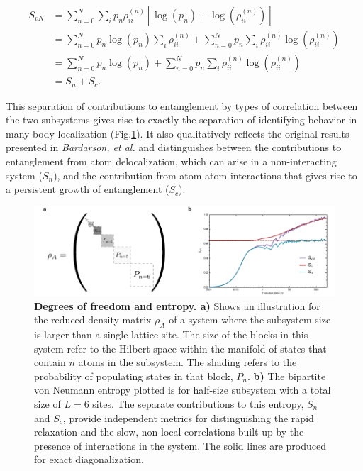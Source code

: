\begin{equation}
\begin{aligned}
S_{vN}&=\sum_{n=0}^N \sum_i p_n \rho_{ii}^{(n)} \left[\log{\left ( p_n \right )} + \log {\left ( \rho_{ii}^{(n)} \right )} \right] \\
&=\sum_{n=0}^N p_n \log{\left ( p_n \right )} \sum_i \rho_{ii}^{(n)} + \sum_{n=0}^N p_n \sum_{i} \rho_{ii}^{(n)} \log {\left ( \rho_{ii}^{(n)} \right )} \\
&=\sum_{n=0}^N p_n \log{\left ( p_n \right )} + \sum_{n=0}^N p_n \sum_{i} \rho_{ii}^{(n)} \log {\left ( \rho_{ii}^{(n)} \right )} \\
&=S_{n} + S_{c}.
\end{aligned}
\label{eqn:svn_sep}
\end{equation}

This separation of contributions to entanglement by types of correlation between the two subsystems gives rise to exactly the separation of identifying behavior in many-body localization (Fig.\ref{fig:sepSvn}). It also qualitatively reflects the original results presented in \emph{Bardarson, et al.}\cite{Bardarson2012} and distinguishes between the contributions to entanglement from atom delocalization, which can arise in a non-interacting system ($S_n$), and the contribution from atom-atom interactions that gives rise to a persistent growth of entanglement ($S_c$).

\begin{figure}[t!]
		\includegraphics[width=\columnwidth]{figures/ch5/combo_sep_svn.pdf} 
		\caption{\textbf{Degrees of freedom and entropy. a)} Shows an illustration for the reduced density matrix $\rho_A$ of a system where the subsystem size is larger than a single lattice site. The size of the blocks in this system refer to the Hilbert space within the manifold of states that contain $n$ atoms in the subsystem. The shading refers to the probability of populating states in that block, $P_n$. \textbf{b)} The bipartite von Neumann entropy plotted is for half-size subsystem with a total size of $L=6$ sites. The separate contributions to this entropy, $S_n$ and $S_c$, provide independent metrics for distinguishing the rapid relaxation and the slow, non-local correlations built up by the presence of interactions in the system. The solid lines are produced for exact diagonalization.}
		\label{fig:sepSvn}	
\end{figure}

